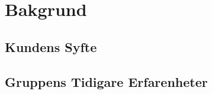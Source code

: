 \chapter{Bakgrund}
\label{cha:background}

\section{Kundens Syfte}
\label{sec:customer-aim}

\section{Gruppens Tidigare Erfarenheter}
\label{sec:earlier-experience}
